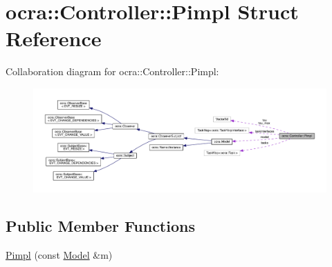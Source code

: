\hypertarget{structocra_1_1Controller_1_1Pimpl}{}\section{ocra\+:\+:Controller\+:\+:Pimpl Struct Reference}
\label{structocra_1_1Controller_1_1Pimpl}


Collaboration diagram for ocra\+:\+:Controller\+:\+:Pimpl\+:\nopagebreak
\begin{figure}[H]
\begin{center}
\leavevmode
\includegraphics[width=350pt]{dc/d34/structocra_1_1Controller_1_1Pimpl__coll__graph}
\end{center}
\end{figure}
\subsection*{Public Member Functions}
\begin{DoxyCompactItemize}
\item 
\hyperlink{structocra_1_1Controller_1_1Pimpl_ad59ee786ca8b100a87e797cdfc6c15f5}{Pimpl} (const \hyperlink{classocra_1_1Model}{Model} \&m)
\end{DoxyCompactItemize}
